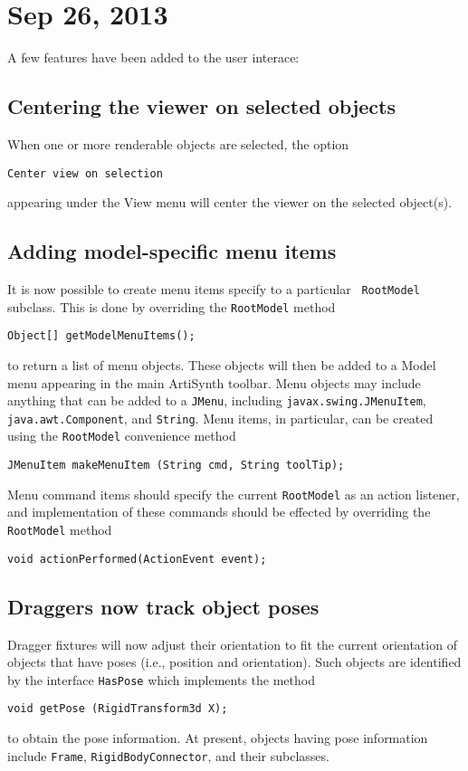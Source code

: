 \documentclass{article}
\begin{document}
\section*{Sep 26, 2013}

A few features have been added to the user interace:

\subsection*{Centering the viewer on selected objects}

When one or more renderable objects are selected, the option
\begin{verbatim}
Center view on selection
\end{verbatim}
appearing under the {\sf View} menu will center the viewer 
on the selected object(s).

\subsection*{Adding model-specific menu items}

It is now possible to create menu items specify to a particular {\tt
RootModel} subclass. This is done by overriding the {\tt RootModel}
method
\begin{verbatim}
Object[] getModelMenuItems();
\end{verbatim}
to return a list of menu objects. These objects will then be added to
a {\sf Model} menu appearing in the main ArtiSynth toolbar. Menu
objects may include anything that can be added to a {\tt JMenu},
including {\tt javax.swing.JMenuItem}, {\tt java.awt.Component}, and
{\tt String}. Menu items, in particular, can be created using the
{\tt RootModel} convenience method
\begin{verbatim}
JMenuItem makeMenuItem (String cmd, String toolTip);
\end{verbatim}
Menu command items should specify the current {\tt RootModel} as an
action listener, and implementation of these commands should be
effected by overriding the {\tt RootModel} method
\begin{verbatim}
void actionPerformed(ActionEvent event);
\end{verbatim}

\subsection*{Draggers now track object poses}

Dragger fixtures will now adjust their orientation to fit the current
orientation of objects that have poses (i.e., position and
orientation). Such objects are identified by the interface {\tt HasPose}
which implements the method
\begin{verbatim}
void getPose (RigidTransform3d X);
\end{verbatim}
to obtain the pose information. At present, objects having pose
information include {\tt Frame}, {\tt RigidBodyConnector}, and their
subclasses.
\end{document}
